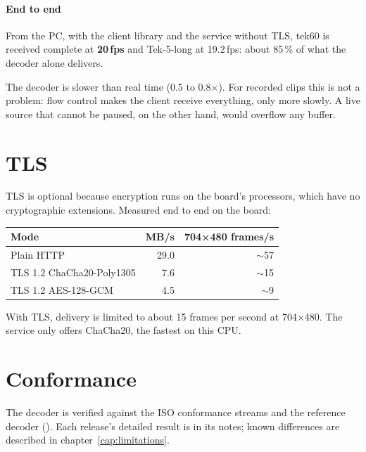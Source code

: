 \paragraph{End to end} From the PC, with the client library and the
 service without TLS, tek60 is received complete at
\textbf{20\,fps} and Tek-5-long at 19.2\,fps: about 85\,\% of what the decoder
alone delivers.

\begin{nota}[Note]
The decoder is slower than real time (0.5 to 0.8×). For recorded clips this
is not a problem: flow control makes the client receive everything, only more
slowly. A live source that cannot be paused, on the other hand, would overflow
any buffer.
\end{nota}

\section{TLS}

TLS is optional because encryption runs on the board's processors, which have
no cryptographic extensions. Measured end to end on the board:

\begin{center}
\begin{tabular}{@{}l r r@{}}
\toprule
\textbf{Mode} & \textbf{MB/s} & \textbf{704×480 frames/s} \\
\midrule
Plain HTTP                 & 29.0 & $\sim$57 \\
TLS 1.2 ChaCha20-Poly1305  &  7.6 & $\sim$15 \\
TLS 1.2 AES-128-GCM        &  4.5 & $\sim$9 \\
\bottomrule
\end{tabular}
\end{center}

With TLS, delivery is limited to about 15 frames per second at 704×480. The
service only offers ChaCha20, the fastest on this CPU.

\section{Conformance}

The decoder is verified against the ISO conformance streams and the reference
decoder (). Each release's detailed result is in its
notes; known differences are described in chapter~\ref{cap:limitations}.
